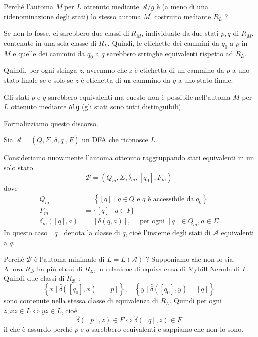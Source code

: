 Perché l'automa $M$ per $L$ ottenuto mediante $\mathcal{A} / g$ è (a meno di una ridenominazione degli stati) lo stesso automa $M^{\prime}$ costruito mediante $R_{L}$ ?

Se non lo fosse, ci sarebbero due classi di $R_{M}$, individuate da due stati $p, q$ di $R_{M}$, contenute in una sola classe di $R_{L}$.
Quindi, le etichette dei cammini da $q_{0}$ a $p$ in $M$ e quelle dei cammini da $q_{0}$ a $q$ sarebbero stringhe equivalenti rispetto ad $R_{L}$.

Quindi, per ogni stringa $z$, avremmo che $z$ è etichetta di un cammino da $p$ a uno stato finale se e solo se $z$ è etichetta di un cammino da $q$ a uno stato finale.

Gli stati $p$ e $q$ sarebbero equivalenti ma questo non è possibile nell'automa $M$ per $L$ ottenuto mediante \texttt{Alg} (gli stati sono tutti distinguibili).

Formalizziamo questo discorso.

\vspace{5mm}

Sia $\mathcal{A}=\left(Q, \Sigma, \delta, q_{0}, F\right)$ un DFA che riconosce $L$.

Consideriamo nuovamente l'automa ottenuto raggruppando stati equivalenti in un solo stato
$$
\mathcal{B}=\left(Q_{m}, \Sigma, \delta_{m},\left[q_{0}\right], F_{m}\right)
$$
dove
$$
\begin{aligned}
Q_{m} &=\left\{[q] \mid q \in Q \text { e } q \text { è accessibile da } q_{0}\right\} \\
F_{m} &=\{[q] \mid q \in F\} \\
\delta_{m}([q], a) &=[\delta(q, a)], \quad \text { per ogni }[q] \in Q_{m}, a \in \Sigma
\end{aligned}
$$
In questo caso $[q]$ denota la classe di $q$, cioè l'insieme degli stati di $\mathcal{A}$ equivalenti a $q$.

\vspace{5mm}

Perché $\mathcal{B}$ è l'automa minimale di $L=L(\mathcal{A})$ ?
Supponiamo che non lo sia. Allora $R_{\mathcal{B}}$ ha più classi di $R_{L}$, la relazione di equivalenza di Myhill-Nerode di $L$. Quindi due classi di $R_{\mathcal{B}}$ :
$$
\left\{x \mid \hat{\delta}\left(\left[q_{0}\right], x\right)=[p]\right\}, \quad\left\{y \mid \hat{\delta}\left(\left[q_{0}\right], y\right)=[q]\right\}
$$
sono contenute nella stessa classe di equivalenza di $R_{L}$.
Quindi per ogni $z, x z \in L \Leftrightarrow y z \in L$, cioè
$$
\hat{\delta}([p], z) \in F \Leftrightarrow \hat{\delta}([q], z) \in F
$$
il che è assurdo perché $p$ e $q$ sarebbero equivalenti e sappiamo che non lo sono.

